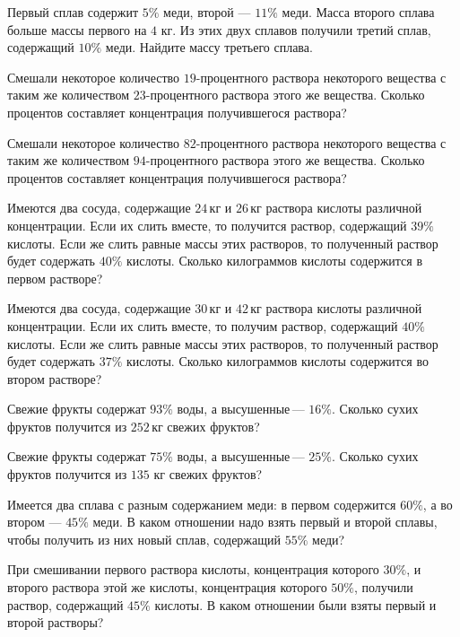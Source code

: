 %
%

\begin{class}[number=1]
	\begin{listofex}
		\item Первый сплав содержит \( 5\% \) меди, второй --- \( 11\% \) меди. Масса второго сплава больше массы первого на \( 4 \) кг. Из этих двух сплавов получили третий сплав, содержащий \( 10\% \) меди. Найдите массу третьего сплава.
		\item Смешали некоторое количество \( 19 \)-процентного раствора некоторого вещества с таким же количеством \( 23 \)-процентного раствора этого же вещества. Сколько процентов составляет концентрация получившегося раствора?
		\item Смешали некоторое количество \( 82 \)-процентного раствора некоторого вещества с таким же количеством \( 94 \)-процентного раствора этого же вещества. Сколько процентов составляет концентрация получившегося раствора?
		\item Имеются два сосуда, содержащие \( 24 \) кг и \( 26 \) кг раствора кислоты различной концентрации. Если их слить вместе, то получится раствор, содержащий \( 39\% \) кислоты. Если же слить равные массы этих растворов, то полученный раствор будет содержать \( 40\% \) кислоты. Сколько килограммов кислоты содержится в первом растворе?
		\item Имеются два сосуда, содержащие \( 30 \) кг и \( 42 \) кг раствора кислоты различной концентрации. Если их слить вместе, то получим раствор, содержащий \( 40\% \) кислоты. Если же слить равные массы этих растворов, то полученный раствор будет содержать \( 37\% \) кислоты. Сколько килограммов кислоты содержится во втором растворе?
		\item Свежие фрукты содержат \( 93\% \) воды, а высушенные --- \( 16\% \). Сколько сухих фруктов получится из \( 252 \) кг свежих фруктов?
		\item Свежие фрукты содержат \( 75\% \) воды, а высушенные --- \( 25\% \). Сколько сухих фруктов получится из \( 135 \) кг свежих фруктов?
		\item Имеется два сплава с разным содержанием меди: в первом содержится \( 60\% \), а во втором --- \( 45\% \) меди. В каком отношении надо взять первый и второй сплавы, чтобы получить из них новый сплав, содержащий \( 55\% \) меди?
		\item При смешивании первого раствора кислоты, концентрация которого \( 30\% \), и второго раствора этой же кислоты, концентрация которого \( 50\% \), получили раствор, содержащий \( 45\% \) кислоты. В каком отношении были взяты первый и второй растворы?
	\end{listofex}
\end{class}

